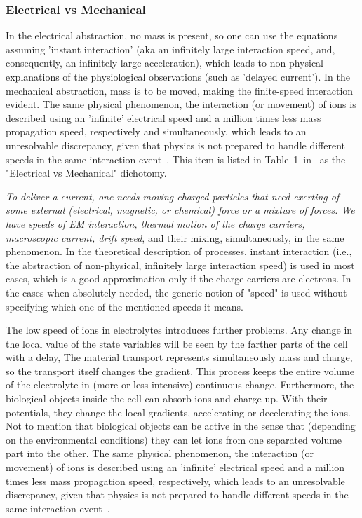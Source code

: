 \subsubsection{Electrical vs Mechanical\label{sec:Physics-ElectricalMechanical}\label{sec:Physics-SlowCurrent}}

In the electrical abstraction, no mass is present,
so one can use the equations assuming 'instant interaction' (aka an infinitely
large interaction speed, and, consequently, an infinitely
large acceleration),
which leads to non-physical explanations of the physiological observations (such as 'delayed current').
In the mechanical abstraction, mass is to be moved, 
making the finite-speed interaction evident. The same physical phenomenon,
the interaction (or movement) of ions is described using an 'infinite' electrical speed and 
a million times less mass propagation speed, respectively and simultaneously, which leads
to an unresolvable discrepancy, given that physics is not prepared to handle
different speeds in the same interaction event~\cite{VeghNon-ordinaryLaws:2025}.
This item is listed in Table~1~in~\cite{ThermodynamicAPDrukarch:2022}
as the "Electrical vs Mechanical" dichotomy.


\textit{To deliver a
current, one needs moving charged particles that need exerting of some
external (electrical, magnetic, or chemical) force or a mixture of forces.
We have speeds of 
\gls{EM} interaction, thermal motion of the charge
carriers, macroscopic current, drift speed}, and their mixing, simultaneously,
in the same phenomenon. In the theoretical description of
processes, instant interaction (i.e., the abstraction of non-physical,
infinitely large interaction speed) is used in most cases, which is a
good approximation only if the charge carriers are electrons. In the
cases when absolutely needed, the generic notion of "speed" is
used without specifying which one of the mentioned speeds it means.

The low speed of ions in electrolytes introduces further problems.
Any change in the local value of the state variables will be seen
by the farther parts of the cell with a delay,
The material transport represents simultaneously mass and charge,
so the transport itself changes the gradient. This process keeps the entire volume of the electrolyte in (more or less intensive) continuous change. Furthermore, the biological objects inside the cell
can absorb ions and charge up. With their potentials, they change the local gradients, accelerating or decelerating the ions. 
Not to mention that biological objects can be active in the sense that 
(depending on the environmental conditions) they can let ions from one separated volume part into the other. 
The same physical phenomenon,
the interaction (or movement) of ions is described using an 'infinite' electrical speed and 
a million times less mass propagation speed, respectively, which leads
to an unresolvable discrepancy, given that physics is not prepared to handle
different speeds in the same interaction event~\cite{VeghNon-ordinaryLaws:2025}.


